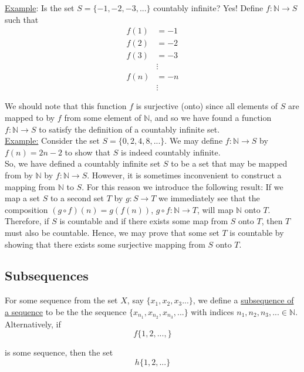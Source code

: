 \documentclass[12pt]{article}
\newlength\tindent
\renewcommand{\indent}{\hspace*{\tindent}}
\newcommand{\N}{\mathbb N}
\begin{document}
\underline{Example}: Is the set $S = \{-1, -2, -3, ... \}$ countably infinite? Yes! Define $f:\N \to S$ such that
\begin{align*}
	f(1) &= -1 \\
	f(2) &= -2 \\
	f(3) &= -3  \\
	&\vdots \\
	f(n) &= -n \\
	&\vdots
\end{align*}

\indent We should note that this function $f$ is surjective (onto) since all elements of $S$ are mapped to by $f$ from some element of $\N$, and so we have found a function $f:\N \to S$ to satisfy the definition of a countably infinite set. \\

\underline{Example:} Consider the set $S = \{0,2,4,8,...\}$. We may define $f:\N\to S$ by $f(n) = 2n - 2$ to show that $S$ is indeed countably infinite. \\

\indent So, we have defined a countably infinite set $S$ to be a set that may be mapped from by $\N$ by $f:\N\to S$. However, it is sometimes inconvenient to construct a mapping from $\N$ to $S$. For this reason we introduce the following result: If we map a set $S$ to a second set $T$ by $g:S\to T$ we immediately see that the composition $(g\circ f)(n) = g(f(n))$, $g\circ f:\N \to T$, will map $\N$ onto $T$. Therefore, if $S$ is countable and if there exists some map from $S$ onto $T$, then $T$ must also be countable. Hence, we may prove that some set $T$ is countable by showing that there exists some surjective mapping from $S$ onto $T$.

\subsection{Subsequences}

\indent For some sequence from the set $X$, say $\{x_1, x_2, x_3 ...\}$, we define a \underline{subsequence of a sequence} to be the the sequence $\{x_{n_1}, x_{n_2}, x_{n_3},...\}$ with indices $n_1, n_2, n_3, ... \in \N$. Alternatively, if 
\begin{equation*}
	f\{1,2,...,\}
\end{equation*}

is some sequence, then the set
\begin{equation*}
	h\{1,2,...\}
\end{equation*}
\end{document}
